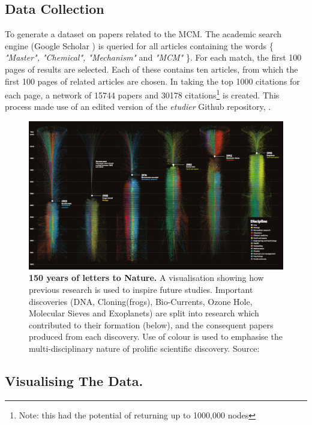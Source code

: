 \subsection{Data Collection}\label{sec:scholar}

To generate a dataset on papers related to the MCM. The academic search engine (Google Scholar \citep{scholar}) is queried for all articles containing the words \{ \emph{"Master", "Chemical", "Mechanism"} and \emph{"MCM"} \}. For each match, the first 100 pages of results are selected. Each of these contains ten articles, from which the first 100 pages of related articles are chosen.
In taking the top 1000 citations for each page, a network of 15744 papers and 30178 citations\footnote{Note: this had the potential of returning up to 1000,000 nodes} is created. This process made use of an edited version of the  \emph{etudier} Github repository, \citep{web}.


\begin{figure}[H]
     \centering
         \includegraphics[width=0.92\textheight,angle=90]{figures_c3/naturegraph.png}

        \caption{\textbf{150 years of letters to Nature.} A visualisation showing how previous research is used to inspire future studies. Important discoveries (DNA, Cloning(frogs), Bio-Currents, Ozone Hole, Molecular Sieves and Exoplanets) are split into research which contributed to their formation (below), and the consequent papers produced from each discovery. Use of colour is used to emphasise the multi-disciplinary nature of prolific scientific discovery. Source: \citep{naturecover}}
        \label{fig:naturecover}
\end{figure}


\subsection{Visualising The Data.}

